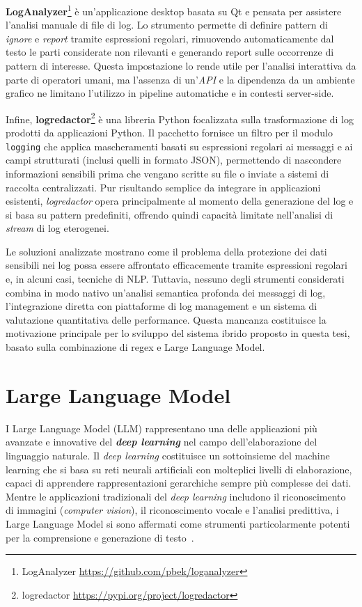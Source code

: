\documentclass[12pt,twoside]{report}
\begin{document}
\textbf{LogAnalyzer}\footnote{LogAnalyzer \url{https://github.com/pbek/loganalyzer}} è un'applicazione desktop basata su Qt e pensata per assistere l'analisi manuale di file di log. Lo strumento permette di definire pattern di \textit{ignore} e \textit{report} tramite espressioni regolari, rimuovendo automaticamente dal testo le parti considerate non rilevanti e generando report sulle occorrenze di pattern di interesse. Questa impostazione lo rende utile per l'analisi interattiva da parte di operatori umani, ma l'assenza di un'\textit{API} e la dipendenza da un ambiente grafico ne limitano l'utilizzo in pipeline automatiche e in contesti server-side.

Infine, \textbf{logredactor}\footnote{logredactor \url{https://pypi.org/project/logredactor}} è una libreria Python focalizzata sulla trasformazione di log prodotti da applicazioni Python. Il pacchetto fornisce un filtro per il modulo \texttt{logging} che applica mascheramenti basati su espressioni regolari ai messaggi e ai campi strutturati (inclusi quelli in formato JSON), permettendo di nascondere informazioni sensibili prima che vengano scritte su file o inviate a sistemi di raccolta centralizzati. Pur risultando semplice da integrare in applicazioni esistenti, \textit{logredactor} opera principalmente al momento della generazione del log e si basa su pattern predefiniti, offrendo quindi capacità limitate nell'analisi di \textit{stream} di log eterogenei.

Le soluzioni analizzate mostrano come il problema della protezione dei dati sensibili nei log possa essere affrontato efficacemente tramite espressioni regolari e, in alcuni casi, tecniche di NLP. Tuttavia, nessuno degli strumenti considerati combina in modo nativo un'analisi semantica profonda dei messaggi di log, l'integrazione diretta con piattaforme di log management e un sistema di valutazione quantitativa delle performance. Questa mancanza costituisce la motivazione principale per lo sviluppo del sistema ibrido proposto in questa tesi, basato sulla combinazione di regex e Large Language Model.

\section{Large Language Model}
\label{sec:llm}

I Large Language Model (LLM) rappresentano una delle applicazioni più avanzate e innovative del \textbf{\textit{deep learning}} nel campo dell'elaborazione del linguaggio naturale. Il \textit{deep learning} costituisce un sottoinsieme del machine learning che si basa su reti neurali artificiali con molteplici livelli di elaborazione, capaci di apprendere rappresentazioni gerarchiche sempre più complesse dei dati. Mentre le applicazioni tradizionali del \textit{deep learning} includono il riconoscimento di immagini (\textit{computer vision}), il riconoscimento vocale e l'analisi predittiva, i Large Language Model si sono affermati come strumenti particolarmente potenti per la comprensione e generazione di testo~\cite{shinde2018review_ml_dl}.
\end{document}
